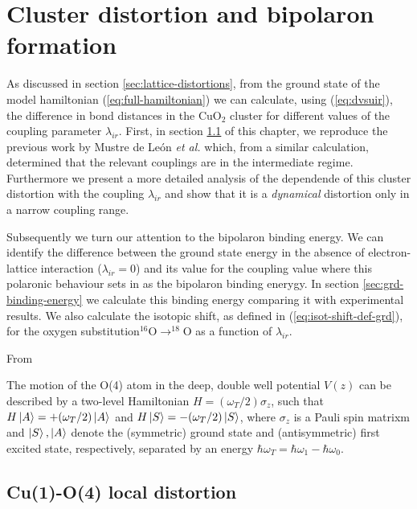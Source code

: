 \chapter{Cluster distortion and bipolaron formation}
\label{chap:ground}

As discussed in section \ref{sec:lattice-distortions}, from the ground state of the model hamiltonian (\ref{eq:full-hamiltonian}) we can calculate, using (\ref{eq:dvsuir}), the difference in bond distances in the CuO$_2$ cluster for different values of the coupling parameter $\lambda_{ir}$.
First, in section \ref{sec:grd-phonon-proj} of this chapter, we reproduce the previous work by Mustre de Le\'{o}n \textit{et al.} \cite{MustredeLeon1992} which, from a similar calculation, determined that the relevant couplings are in the intermediate regime. Furthermore we present a more detailed analysis of the dependende of this cluster distortion with the coupling $\lambda_{ir}$ and show that it is a \textit{dynamical} distortion only in a narrow coupling range.

Subsequently we turn our attention to the bipolaron binding energy. 
We can identify the difference between the ground state energy in the absence of electron-lattice interaction ($\lambda_{ir}=0$) and its value for the coupling value where this polaronic behaviour sets in as the bipolaron binding enerygy.
In section \ref{sec:grd-binding-energy} we calculate this binding energy comparing it with experimental results.
We also calculate the isotopic shift, as defined in (\ref{eq:isot-shift-def-grd}), for the oxygen substitution$^{16}$O$\rightarrow ^{18}$O as a function of $\lambda_{ir}$.


From \cite{Conradson1990}

The motion of the O(4) atom in the deep, double well potential $V(z)$ can be described by a two-level Hamiltonian $H=(\omega_T/2)\sigma_z$,  such that $H\left | A \right\rangle=+(\omega_T/2)\left | A \right\rangle$ and $H\left | S \right\rangle=-(\omega_T/2)\left | S \right\rangle$, where $\sigma_z$ is a Pauli spin matrixm and $\left | S \right\rangle,\left | A \right\rangle$ denote the (symmetric) ground state and (antisymmetric) first excited state, respectively, separated by an energy $\hbar\omega_T=\hbar\omega_1-\hbar\omega_0$.




\section{Cu(1)-O(4) local distortion}
\label{sec:grd-phonon-proj}

